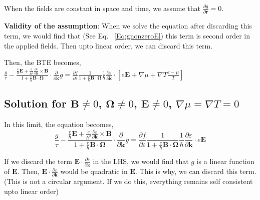 \documentclass{revtex4-2}
\newcommand{\bvec}[1]{{\mathbf #1}}
\begin{document}
When the fields are constant in space and time, we assume that $\frac{\partial{g}}{\partial \bvec{r}} = 0$.

\textbf{Validity of the assumption}: When we solve the equation after discarding this term, we would find that (See Eq. ~\eqref{Eq:gnonzeroE}) this term is second order in the applied fields. Then upto linear order, we can discard this term.

Then, the BTE becomes,
$\frac{g}{\tau} -\frac{\frac{e}{\hbar} \bvec{E} +\frac{e}{\hbar^2} \frac{\partial \varepsilon}{\partial \bvec{k}} \times \bvec{B}}{1 + \frac{e}{\hbar} \bvec{B}\cdot\bvec{\Omega}} \cdot\frac{\partial}{\partial \bvec{k}} g = \frac{\partial f}{\partial \varepsilon}\frac{1}{1 + \frac{e}{\hbar} \bvec{B}\cdot\bvec{\Omega}}
\frac{1}{\hbar} \frac{\partial \varepsilon}{\partial \bvec{k}}\cdot\left[e \bvec{E} + \nabla{\mu} + \nabla T \frac{\varepsilon - \mu}{T}\right] $


\subsection{Solution for $\bvec{B}\neq0$, $\bvec{\Omega}\neq 0$, $\bvec{E} \neq 0$, $\nabla \mu = \nabla T = 0$}

In this limit, the equation becomes,
$$
\frac{g}{\tau} -\frac{\frac{e}{\hbar} \bvec{E} +\frac{e}{\hbar^2} \frac{\partial \varepsilon}{\partial \bvec{k}} \times \bvec{B}}{1 + \frac{e}{\hbar} \bvec{B}\cdot\bvec{\Omega}} \cdot\frac{\partial}{\partial \bvec{k}} g = \frac{\partial f}{\partial \varepsilon}\frac{1}{1 + \frac{e}{\hbar} \bvec{B}\cdot\bvec{\Omega}}
\frac{1}{\hbar} \frac{\partial \varepsilon}{\partial \bvec{k}}\cdot e \bvec{E} $$

If we discard the term $\bvec{E} \cdot \frac{\partial \varepsilon}{\partial \bvec{k}}$ in the LHS, we would find that $g$ is a linear function of $\bvec{E}$. Then, $\bvec{E} \cdot \frac{\partial \varepsilon}{\partial \bvec{k}}$ would be quadratic in $\bvec{E}$. This is why, we can discard this term. (This is not a circular argument. If we do this, everything remains self consistent upto linear order)
\end{document}

